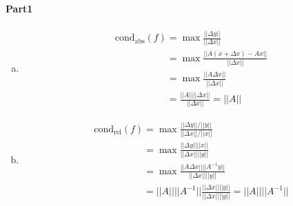 \documentclass[11pt]{article}
\begin{document}
	\paragraph{Part1}
		\begin{enumerate}[(a)]
			\item 
				\begin{align}
					&\mathrm{cond_{abs}}(f) = \max \frac{||\Delta y||}{||\Delta x||}\nonumber\\
					&\phantom{\mathrm{cond_{abs}}(f)} = \max \frac{||A(x + \Delta x) - Ax||}{||\Delta x||}\nonumber\\
					&\phantom{\mathrm{cond_{abs}}(f)} = \max \frac{||A\Delta x||}{||\Delta x||}\nonumber\\
					&\phantom{\mathrm{cond_{abs}}(f)} = \frac{||A||||\Delta x||}{||\Delta x||} = ||A||\nonumber
				\end{align}
			\item 
				\begin{align}
					&\mathrm{cond_{rel}}(f) = \max \frac{||\Delta y||/||y||}{||\Delta x||/||x||}\nonumber\\
					&\phantom{\mathrm{cond_{rel}}(f)} = \max \frac{||\Delta y||||x||}{||\Delta x||||y||}\nonumber\\
					&\phantom{\mathrm{cond_{rel}}(f)} = \max \frac{||A\Delta x||||A^{-1}y||}{||\Delta x||||y||}\nonumber\\
					&\phantom{\mathrm{cond_{rel}}(f)} = ||A||||A^{-1}|| \frac{||\Delta x||||y||}{||\Delta x||||y||}  = ||A||||A^{-1}||\nonumber
				\end{align}
		\end{enumerate}
\end{document}
